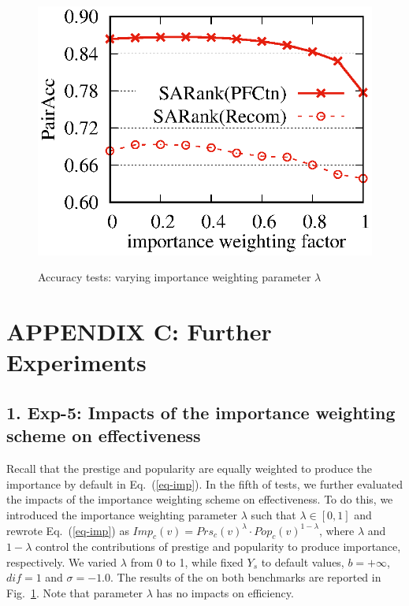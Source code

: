 \begin{figure}[tb!]
\begin{center}
{\includegraphics[scale=0.38]{./exp/MAG_lambda.eps}}
\end{center}
\vspace{-5ex}
\caption{\small Accuracy tests: varying importance weighting parameter $\lambda$}
\label{fig-lambda}
\vspace{-3ex}
\end{figure}



\vspace{-1ex}
\section*{APPENDIX C: Further Experiments}
\label{sec-exp-app2}


\subsection*{1. Exp-5: Impacts of the importance weighting scheme on effectiveness}

Recall that the prestige and popularity are equally weighted to produce the importance by default in Eq.~(\ref{eq-imp}). In the fifth of tests, we further evaluated the impacts of the importance weighting scheme on effectiveness. To do this, we introduced the importance weighting parameter $\lambda$ such that $\lambda \in [0,1]$ and rewrote Eq.~(\ref{eq-imp}) as $Imp_c(v) = Prs_c(v)^\lambda \cdot Pop_c(v)^{1-\lambda}$, where $\lambda$ and $1-\lambda$ control the contributions of prestige and popularity to produce importance, respectively.
We varied $\lambda$ from 0 to 1, while fixed $Y_s$ to default values, $b=+\infty$, $dif=1$ and $\sigma=-1.0$. The results of the \PairAcc on both benchmarks are reported in Fig.~\ref{fig-lambda}. Note that parameter $\lambda$ has no impacts on efficiency.

